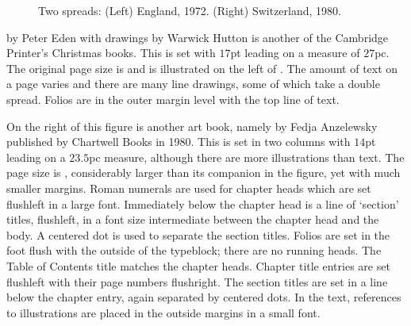 \documentclass[10pt,a4paper,oneside,extrafontsizes]{memoir}%
\begin{document}
\begin{figure}
\centering
\begin{minipage}[b]{\pwlayi}
\end{minipage}
\hfill
\begin{minipage}[b]{\pwlayi}
\end{minipage}
\caption[Two spreads: England, 1972 and Switzerland, 1980]%
        {Two spreads: (Left) England, 1972.
         (Right) Switzerland, 1980.} \label{fb:15}
\end{figure}

\begin{paracol}{2}
\switchEng
     by Peter Eden with drawings by
Warwick Hutton is another of the Cambridge 
Printer's Christmas books.
This is set with $17$pt leading on a measure of $27$pc. The original
page size is  and is illustrated on the left 
of . 
The amount of text on a page varies
and there are many line drawings, some of which take a double spread.
Folios are in the outer margin level with the top
line of text.

On the right of this figure is another art book, namely 
by Fedja Anzelewsky published by Chartwell Books in 1980. This is set in
two columns with $14$pt leading on a $23.5$pc measure, 
although there are more illustrations than text. The page
size is , considerably larger than its companion in
the figure, yet with much smaller margins.
Roman numerals are used for chapter heads which are
set flushleft in a large font. Immediately below the chapter head is a line
of `section' titles, flushleft, in a font size intermediate between the
chapter head and the body. A centered dot is used to separate the section
titles. Folios are set in the foot flush
with the outside of the typeblock; there are no running heads. 
The Table of Contents title matches the chapter heads.
Chapter title entries are set flushleft with their page numbers flushright.
The section titles are set in a line below the chapter entry, again separated
by centered dots. In the text, references to 
illustrations are placed in the outside margins in 
a small font.
\end{paracol}
\end{document}
